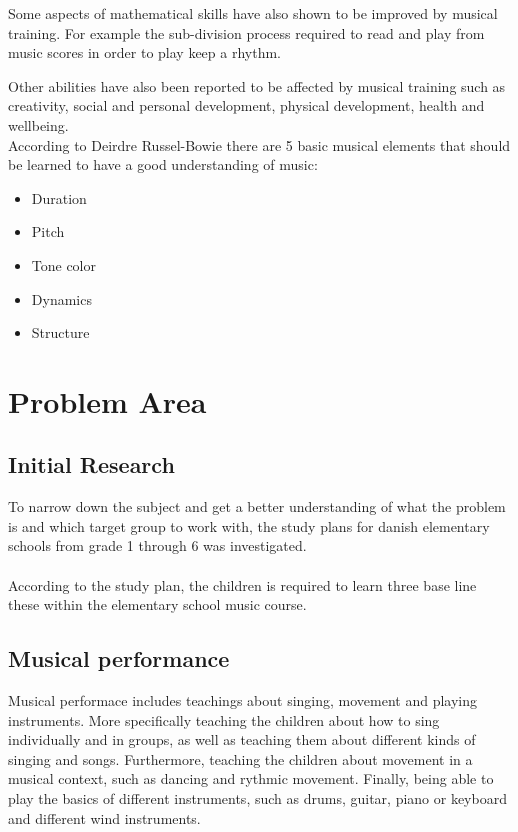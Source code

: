 Some aspects of mathematical skills have also shown to be improved by musical training. For example the sub-division process required to read and play from music scores in order to play keep a rhythm\cite{powerOfMusic}.

Other abilities have also been reported to be affected by musical training such as creativity, social and personal development, physical development, health and wellbeing\cite{powerOfMusic}.\\

According to Deirdre Russel-Bowie there are 5 basic musical elements that should be learned to have a good understanding of music\cite{primaryArts}:
\begin{itemize}
	\item Duration
	\item Pitch
	\item Tone color
	\item Dynamics
	\item Structure
\end{itemize}

\section{Problem Area}

	\subsection{Initial Research}
	To narrow down the subject and get a better understanding of what the problem is and which target group to work with, the study plans for danish elementary schools from grade 1 through 6 was investigated.\\
	\\
	According to the study plan, the children is required to learn three base line these within the elementary school music course. 
	\subsection*{Musical performance}
	Musical performace includes teachings about singing, movement and playing instruments. More specifically teaching the children about how to sing individually and in groups, as well as teaching them about different kinds of singing and songs. Furthermore, teaching the children about movement in a musical context, such as dancing and rythmic movement. Finally, being able to play the basics of different instruments, such as drums, guitar, piano or keyboard and different wind instruments.
	
